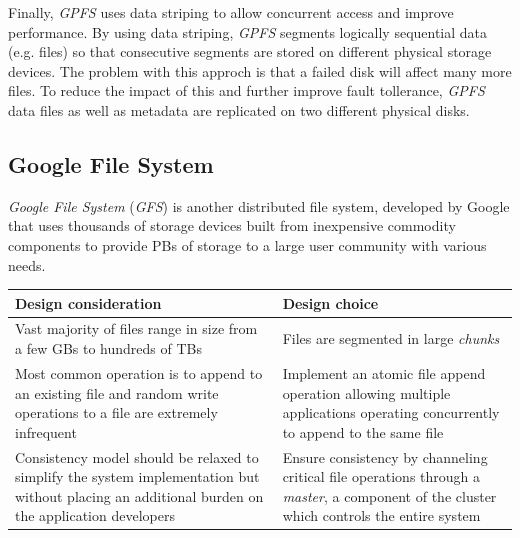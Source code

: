 Finally, \emph{GPFS} uses data striping to allow concurrent access and improve
performance. By using data striping, \emph{GPFS} segments logically sequential
data (e.g. files) so that consecutive segments are stored on different physical
storage devices. The problem with this approch is that a failed disk will affect
many more files. To reduce the impact of this and further improve fault tollerance,
\emph{GPFS} data files as well as metadata are replicated on two different
physical disks.

\subsection{Google File System}
\emph{Google File System} (\emph{GFS}) is another distributed file system,
developed by Google that uses thousands of storage devices built from inexpensive
commodity components to provide PBs of storage to a large user community
with various needs.

\begin{table}[h!]
    \centering
    \begin{tabular}{|p{}|p{}|}
        \hline
        \textbf{Design consideration} & \textbf{Design choice}\\
        \hline
        Vast majority of files range in size from a few GBs to hundreds of TBs &
        Files are segmented in large \emph{chunks}\\
        \hline
        Most common operation is to append to an existing file and random write
        operations to a file are extremely infrequent & Implement an atomic file
        append operation allowing multiple applications operating concurrently
        to append to the same file\\
        \hline
        Consistency model should be relaxed to simplify the system implementation
        but without placing an additional burden on the application developers &
        Ensure consistency by channeling critical file operations through a
        \emph{master}, a component of the cluster which controls the entire
        system\\
        \hline
    \end{tabular}
\end{table}

